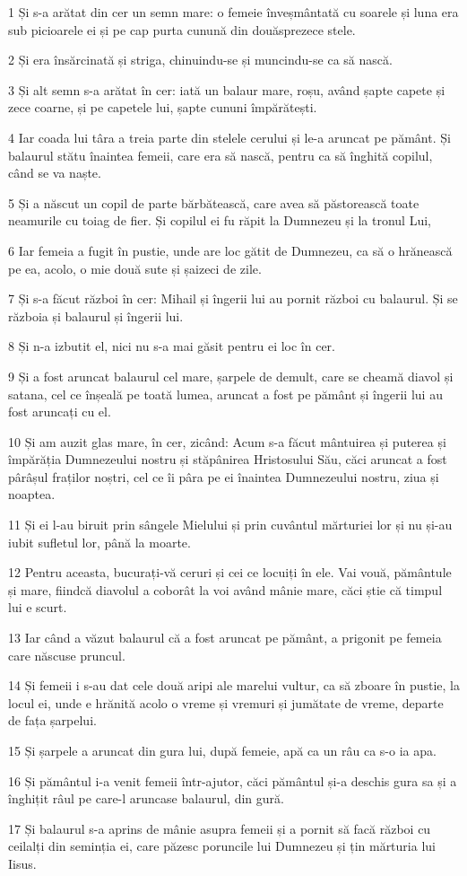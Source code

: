 \par 1 Și s-a arătat din cer un semn mare: o femeie înveșmântată cu soarele și luna era sub picioarele ei și pe cap purta cunună din douăsprezece stele.
\par 2 Și era însărcinată și striga, chinuindu-se și muncindu-se ca să nască.
\par 3 Și alt semn s-a arătat în cer: iată un balaur mare, roșu, având șapte capete și zece coarne, și pe capetele lui, șapte cununi împărătești.
\par 4 Iar coada lui târa a treia parte din stelele cerului și le-a aruncat pe pământ. Și balaurul stătu înaintea femeii, care era să nască, pentru ca să înghită copilul, când se va naște.
\par 5 Și a născut un copil de parte bărbătească, care avea să păstorească toate neamurile cu toiag de fier. Și copilul ei fu răpit la Dumnezeu și la tronul Lui,
\par 6 Iar femeia a fugit în pustie, unde are loc gătit de Dumnezeu, ca să o hrănească pe ea, acolo, o mie două sute și șaizeci de zile.
\par 7 Și s-a făcut război în cer: Mihail și îngerii lui au pornit război cu balaurul. Și se războia și balaurul și îngerii lui.
\par 8 Și n-a izbutit el, nici nu s-a mai găsit pentru ei loc în cer.
\par 9 Și a fost aruncat balaurul cel mare, șarpele de demult, care se cheamă diavol și satana, cel ce înșeală pe toată lumea, aruncat a fost pe pământ și îngerii lui au fost aruncați cu el.
\par 10 Și am auzit glas mare, în cer, zicând: Acum s-a făcut mântuirea și puterea și împărăția Dumnezeului nostru și stăpânirea Hristosului Său, căci aruncat a fost pârâșul fraților noștri, cel ce îi pâra pe ei înaintea Dumnezeului nostru, ziua și noaptea.
\par 11 Și ei l-au biruit prin sângele Mielului și prin cuvântul mărturiei lor și nu și-au iubit sufletul lor, până la moarte.
\par 12 Pentru aceasta, bucurați-vă ceruri și cei ce locuiți în ele. Vai vouă, pământule și mare, fiindcă diavolul a coborât la voi având mânie mare, căci știe că timpul lui e scurt.
\par 13 Iar când a văzut balaurul că a fost aruncat pe pământ, a prigonit pe femeia care născuse pruncul.
\par 14 Și femeii i s-au dat cele două aripi ale marelui vultur, ca să zboare în pustie, la locul ei, unde e hrănită acolo o vreme și vremuri și jumătate de vreme, departe de fața șarpelui.
\par 15 Și șarpele a aruncat din gura lui, după femeie, apă ca un râu ca s-o ia apa.
\par 16 Și pământul i-a venit femeii într-ajutor, căci pământul și-a deschis gura sa și a înghițit râul pe care-l aruncase balaurul, din gură.
\par 17 Și balaurul s-a aprins de mânie asupra femeii și a pornit să facă război cu ceilalți din seminția ei, care păzesc poruncile lui Dumnezeu și țin mărturia lui Iisus.

